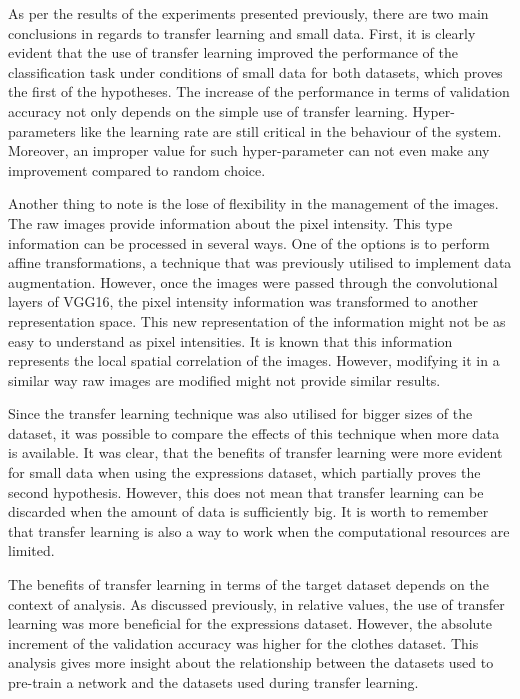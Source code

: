 \documentclass{article}
\begin{document}
As per the results of the experiments presented previously, there are two main conclusions in regards to transfer learning and small data. First, it is clearly evident that the use of transfer learning improved the performance of the classification task under conditions of small data for both datasets, which proves the first of the hypotheses. The increase of the performance in terms of validation accuracy not only depends on the simple use of transfer learning. Hyper-parameters like the learning rate are still critical in the behaviour of the system. Moreover, an improper value for such hyper-parameter can not even make any improvement compared to random choice. 

Another thing to note is the lose of flexibility in the management of the images. The raw images provide information about the pixel intensity. This type information can be processed in several ways. One of the options is to perform affine transformations, a technique that was previously utilised to implement data augmentation. However, once the images were passed through the convolutional layers of VGG16, the pixel intensity information was transformed to another representation space. This new representation of the information might not be as easy to understand as pixel intensities. It is known that this information represents the local spatial correlation of the images. However, modifying it in a similar way raw images are modified might not provide similar results.

Since the transfer learning technique was also utilised for bigger sizes of the dataset, it was possible to compare the effects of this technique when more data is available. It was clear, that the benefits of transfer learning were more evident for small data when using the expressions dataset, which partially proves the second hypothesis. However, this does not mean that transfer learning can be discarded when the amount of data is sufficiently big. It is worth to remember that transfer learning is also a way to work when the computational resources are limited.

The benefits of transfer learning in terms of the target dataset depends on the context of analysis. As discussed previously, in relative values, the use of transfer learning was more beneficial for the expressions dataset. However, the absolute increment of the validation accuracy was higher for the clothes dataset. This analysis gives more insight about the relationship between the datasets used to pre-train a network and the datasets used during transfer learning.     
 
\end{document}
